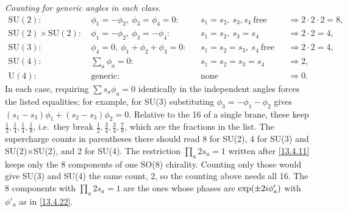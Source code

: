 \begin{tcolorbox}[breakable]
\begin{remark}
		\textit{Counting for generic angles in each class.}
		\begin{align*}
			\mathrm{SU}(2):&\ \phi_1=-\phi_2,\ \phi_3=\phi_4=0: && s_1=s_2,\ s_3,s_4\ \text{free} && \Rightarrow 2\cdot2\cdot2 = 8,\\
			\mathrm{SU}(2)\times\mathrm{SU}(2):&\ \phi_1=-\phi_2,\ \phi_3=-\phi_4: && s_1=s_2,\ s_3=s_4 && \Rightarrow 2\cdot2 = 4,\\
			\mathrm{SU}(3):&\ \phi_4=0,\ \phi_1+\phi_2+\phi_3=0: && s_1=s_2=s_3,\ s_4\ \text{free} && \Rightarrow 2\cdot2 = 4,\\
			\mathrm{SU}(4):&\ \textstyle\sum_a\phi_a=0: && s_1=s_2=s_3=s_4 && \Rightarrow 2,\\
			\mathrm{U}(4):&\ \text{generic}: && \text{none} && \Rightarrow 0 .
		\end{align*}
		In each case, requiring $\sum s_a\phi_a=0$ identically in the independent angles forces the listed equalities; for example, for SU(3) substituting $\phi_3=-\phi_1-\phi_2$ gives $(s_1-s_3)\phi_1+(s_2-s_3)\phi_2=0$. Relative to the 16 of a single brane, these keep $\frac12,\frac14,\frac14,\frac18$, i.e.\ they break $\frac12,\frac34,\frac34,\frac78$, which are the fractions in the list. The supercharge counts in parentheses there should read 8 for SU(2), 4 for SU(3) and SU(2)$\times$SU(2), and 2 for SU(4). The restriction $\prod_a2s_a=1$ written after \eqref{13.4.11} keeps only the 8 components of one SO(8) chirality. Counting only those would give SU(3) and SU(4) the same count, 2, so the counting above needs all 16. The 8 components with $\prod_a2s_a=1$ are the ones whose phases are $\exp(\pm2i\phi'_a)$ with $\phi'_a$ as in \eqref{13.4.22}.
	\end{remark}
\end{tcolorbox}

